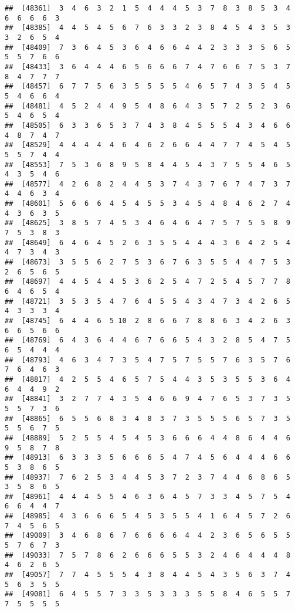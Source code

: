 \documentclass[
]{book}
\begin{document}
\begin{verbatim}
##  [48361]  3  4  6  3  2  1  5  4  4  4  5  3  7  8  3  8  5  3  4  6  6  6  6  3
##  [48385]  4  4  5  4  5  6  7  6  3  3  2  3  8  4  5  4  3  5  3  3  2  6  5  4
##  [48409]  7  3  6  4  5  3  6  4  6  6  4  4  2  3  3  3  5  6  5  5  5  7  6  6
##  [48433]  3  6  4  4  4  6  5  6  6  6  7  4  7  6  6  7  5  3  7  8  4  7  7  7
##  [48457]  6  7  7  5  6  3  5  5  5  5  4  6  5  7  4  3  5  4  5  5  4  6  6  4
##  [48481]  4  5  2  4  4  9  5  4  8  6  4  3  5  7  2  5  2  3  6  5  4  6  5  4
##  [48505]  6  3  3  6  5  3  7  4  3  8  4  5  5  5  4  3  4  6  6  4  8  7  4  7
##  [48529]  4  4  4  4  4  6  4  6  2  6  6  4  4  7  7  4  5  4  5  5  5  7  4  4
##  [48553]  7  5  3  6  8  9  5  8  4  4  5  4  3  7  5  5  4  6  5  4  3  5  4  6
##  [48577]  4  2  6  8  2  4  4  5  3  7  4  3  7  6  7  4  7  3  7  4  4  6  3  4
##  [48601]  5  6  6  6  4  5  4  5  5  3  4  5  4  8  4  6  2  7  4  4  3  6  3  5
##  [48625]  3  8  5  7  4  5  3  4  6  4  6  4  7  5  7  5  5  8  9  7  5  3  8  3
##  [48649]  6  4  6  4  5  2  6  3  5  5  4  4  4  3  6  4  2  5  4  4  7  3  4  3
##  [48673]  3  5  5  6  2  7  5  3  6  7  6  3  5  5  4  4  7  5  3  2  6  5  6  5
##  [48697]  4  4  5  4  4  5  3  6  2  5  4  7  2  5  4  5  7  7  8  6  4  6  5  4
##  [48721]  3  5  3  5  4  7  6  4  5  5  4  3  4  7  3  4  2  6  5  4  3  3  3  4
##  [48745]  6  4  4  6  5 10  2  8  6  6  7  8  8  6  3  4  2  6  3  6  6  5  6  6
##  [48769]  6  4  3  6  4  4  6  7  6  6  5  4  3  2  8  5  4  7  5  6  5  4  4  4
##  [48793]  4  6  3  4  7  3  5  4  7  5  7  5  5  7  6  3  5  7  6  7  6  4  6  3
##  [48817]  4  2  5  5  4  6  5  7  5  4  4  3  5  3  5  5  3  6  4  6  4  4  9  2
##  [48841]  3  2  7  7  4  3  5  4  6  6  9  4  7  6  5  3  7  3  5  5  5  7  3  6
##  [48865]  6  5  5  6  8  3  4  8  3  7  3  5  5  5  6  5  7  3  5  5  5  6  7  5
##  [48889]  5  2  5  5  4  5  4  5  3  6  6  6  4  4  8  6  4  4  6  9  5  8  7  8
##  [48913]  6  3  3  3  5  6  6  6  5  4  7  4  5  6  4  4  4  6  6  5  3  8  6  5
##  [48937]  7  6  2  5  3  4  4  5  3  7  2  3  7  4  4  6  8  6  5  3  5  8  6  5
##  [48961]  4  4  4  5  5  4  6  3  6  4  5  7  3  3  4  5  7  5  4  6  6  4  4  7
##  [48985]  4  3  6  6  6  5  4  5  3  5  5  4  1  6  4  5  7  2  6  7  4  5  6  5
##  [49009]  3  4  6  8  6  7  6  6  6  6  4  4  2  3  6  5  6  5  5  5  7  6  7  3
##  [49033]  7  5  7  8  6  2  6  6  6  5  5  3  2  4  6  4  4  4  8  4  6  2  6  5
##  [49057]  7  7  4  5  5  5  4  3  8  4  4  5  4  3  5  6  3  7  4  5  6  3  5  5
##  [49081]  6  4  5  5  7  3  3  5  3  3  3  5  5  8  4  6  5  5  7  7  5  5  5  5

\end{verbatim}
\end{document}

